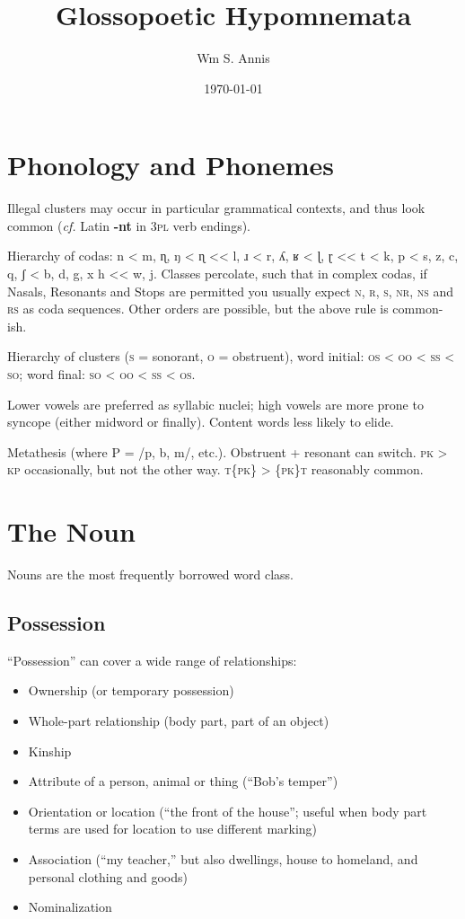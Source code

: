 \documentclass[11pt]{article}
\newcommand{\LL}[1]{\textbf{#1}}  %
\newcommand{\I}[1]{\textsc{#1}}   %
\newenvironment{grammarlist}%
 {\begin{itemize}\addtolength{\itemsep}{-0.5\baselineskip}\ignorespaces}%
 {\end{itemize}\ignorespacesafterend}
\begin{document}
\frenchspacing
\title{Glossopoetic Hypomnemata}
\author{Wm S. Annis}
\date{\today}
\maketitle

\section{Phonology and Phonemes}

Illegal clusters may occur in particular grammatical contexts, and
thus look common (\textit{cf.} Latin \LL{-nt} in \I{3pl} verb
endings).

Hierarchy of codas: n < m, ɳ, ŋ < ɳ << l, ɹ < r, ʎ, ʁ < ɭ, ɽ << t < k,
p < s, z, c, q, ʃ < b, d, g, x h << w, j.  Classes percolate, such
that in complex codas, if Nasals, Resonants and Stops are permitted
you usually expect \I{n, r, s, nr, ns} and \I{rs} as coda sequences.
Other orders are possible, but the above rule is common-ish.

Hierarchy of clusters (\I{s} = sonorant, \I{o} = obstruent), word
initial: \I{os} < \I{oo} < \I{ss} < \I{so}; word final: \I{so} < \I{oo}
< \I{ss} < \I{os}.

Lower vowels are preferred as syllabic nuclei; high vowels are more
prone to syncope (either midword or finally).  Content words less
likely to elide.

Metathesis (where P = /p, b, m/, etc.).  Obstruent + resonant can
switch.  \I{pk} > \I{kp} occasionally, but not the other way.
\I{t\{pk\}} > \I{\{pk\}t} reasonably common.


\section{The Noun}

Nouns are the most frequently borrowed word class.

\subsection{Possession}
``Possession'' can cover a wide range of relationships:

\begin{grammarlist}
  \item Ownership (or temporary possession)
  \item Whole-part relationship (body part, part of an object)
  \item Kinship
  \item Attribute of a person, animal or thing (``Bob's temper'')
  \item Orientation or location (``the front of the house''; useful
    when body part terms are used for location to use different
    marking)
  \item Association (``my teacher,'' but also dwellings, house to
    homeland, and personal clothing and goods)
  \item Nominalization
\end{grammarlist}
\end{document}
